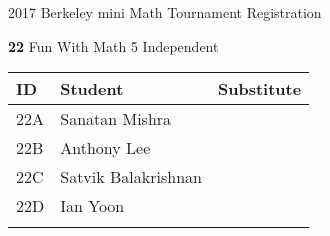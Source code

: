 \documentclass[12pt]{amsart}
\begin{document}
\newpage



\renewcommand{\TeamID}{22}
\renewcommand{\TeamName}{Fun With Math 5}
\renewcommand{\SchoolName}{Independent}
\renewcommand{\IDA}{22A}
\renewcommand{\IDB}{22B}
\renewcommand{\IDC}{22C}
\renewcommand{\IDD}{22D}
\renewcommand{\IDE}{}
\renewcommand{\StudentA}{Sanatan Mishra}
\renewcommand{\StudentB}{Anthony Lee}
\renewcommand{\StudentC}{Satvik Balakrishnan}
\renewcommand{\StudentD}{Ian Yoon}
\renewcommand{\StudentE}{}

\begin{center}
{\sc \Large 2017 Berkeley mini Math Tournament Registration}

\bigskip
\bigskip

{\bf \Large  \TeamID} \hfill {\large \TeamName} \hfill {\large \SchoolName}

\bigskip
\bigskip

\begin{tabular}{| p{} | p{} | p{} |}
\hline
\bf ID         & \bf Student             & \bf Substitute             \\ \hline
\IDA           & \StudentA               &                            \\ \hline
\IDB           & \StudentB               &                            \\ \hline
\IDC           & \StudentC               &                            \\ \hline
\IDD           & \StudentD               &                            \\ \hline
\IDE           & \StudentE               &                            \\ \hline
\end{tabular} 
\end{center}
\bigskip
\bigskip

\newpage



\renewcommand{\TeamID}{23}
\renewcommand{\TeamName}{Fun With Math 6}
\renewcommand{\SchoolName}{Independent}
\renewcommand{\IDA}{23A}
\renewcommand{\IDB}{23B}
\renewcommand{\IDC}{23C}
\renewcommand{\IDD}{23D}
\renewcommand{\IDE}{23E}
\renewcommand{\StudentA}{Daniel Smola}
\renewcommand{\StudentB}{Pratyay Pandey}
\renewcommand{\StudentC}{Supreet Chinta}
\renewcommand{\StudentD}{Archit Raut}
\renewcommand{\StudentE}{Phanindra}
\end{document}
